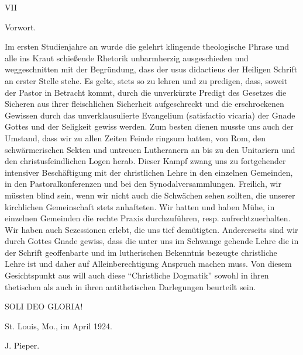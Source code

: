 {\centering VII\par}\vspace{1em}
{\centering Vorwort.\par}
\vspace{1em}
Im ersten Studienjahre an wurde die gelehrt klingende theologische Phrase und alle ins Kraut schießende Rhetorik unbarmherzig ausgeschieden und weggeschnitten mit der Begründung, dass der usus didactieus der Heiligen Schrift an erster Stelle stehe. Es gelte, stets so zu lehren und zu predigen, dass, soweit der Pastor in Betracht kommt, durch die unverkürzte Predigt des Gesetzes die Sicheren aus ihrer fleischlichen Sicherheit aufgeschreckt und die erschrockenen Gewissen durch das unverklausulierte Evangelium (satisfactio vicaria) der Gnade Gottes und der Seligkeit gewiss werden. Zum besten dienen musste uns auch der Umstand, dass wir zu allen Zeiten Feinde ringsum hatten, von Rom, den schwärmerischen Sekten und untreuen Lutheranern an bis zu den Unitariern und den christusfeindlichen Logen herab. Dieser Kampf zwang uns zu fortgehender intensiver Beschäftigung mit der christlichen Lehre in den einzelnen Gemeinden, in den Pastoralkonferenzen und bei den Synodalversammlungen. Freilich, wir müssten blind sein, wenn wir nicht auch die Schwächen sehen sollten, die unserer kirchlichen Gemeinschaft stets anhafteten. Wir hatten und haben Mühe, in einzelnen Gemeinden die rechte Praxis durchzuführen, resp. aufrechtzuerhalten. Wir haben auch Sezessionen erlebt, die uns tief demütigten. Andererseits sind wir durch Gottes Gnade gewiss, dass die unter uns im Schwange gehende Lehre die in der Schrift geoffenbarte und im lutherischen Bekenntnis bezeugte christliche Lehre ist und daher auf Alleinberechtigung Anspruch machen muss. Von diesem Gesichtspunkt aus will auch diese ``Christliche Dogmatik'' sowohl in ihren thetischen als auch in ihren antithetischen Darlegungen beurteilt sein.
\vspace{1em}
{\centering SOLI DEO GLORIA!\par}
\vspace{1em}
{\raggedleft St. Louis, Mo., im April 1924.\par}
{\raggedleft J. Pieper.}